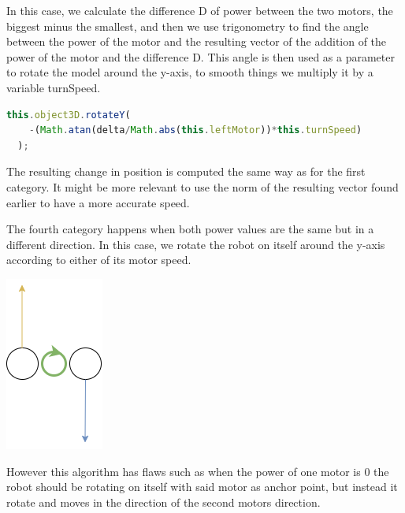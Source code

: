 \documentclass{scrbook}
\begin{document}
In this case, we calculate the difference D of power between the two motors, the biggest minus the smallest, and then we use trigonometry to find the angle between the power of the motor and the resulting vector of the addition of the power of the motor and the difference D.
This angle is then used as a parameter to rotate the model around the y-axis, to smooth things we multiply it by a variable turnSpeed.  

\begin{lstlisting}[language=JavaScript, gobble=2, basicstyle=\ttfamily\small]
  this.object3D.rotateY(
    -(Math.atan(delta/Math.abs(this.leftMotor))*this.turnSpeed)
  );
\end{lstlisting} 

The resulting change in position is computed the same way as for the first category. It might be more relevant to use the norm of the resulting vector 
found earlier to have a more accurate speed.

The fourth category happens when both power values are the same but in a different direction. In this case, we rotate the robot on itself around the y-axis according to either of its motor speed.

\begin{center}
  \includegraphics[scale=1]{./move_spdd}
\end{center}

However this algorithm has flaws such as when the power of one motor is 0 the robot should be rotating on itself with said motor as anchor point, but instead it rotate and moves in the direction of the second motors direction.
\end{document}
